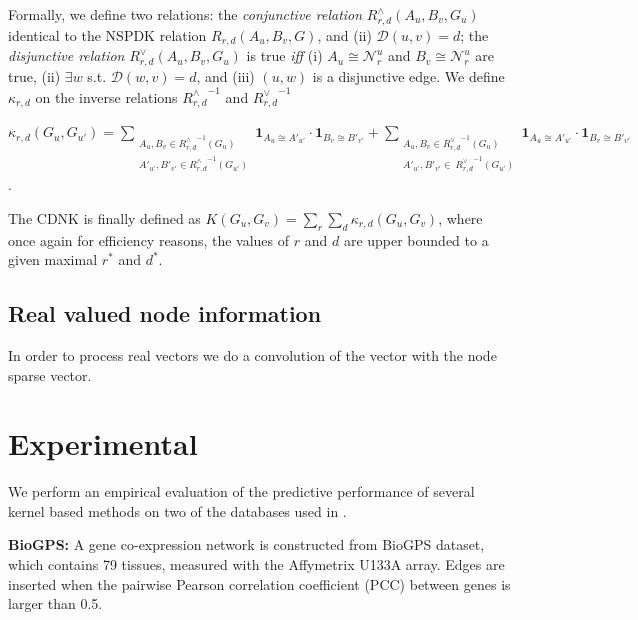 \documentclass[review]{elsarticle}
\begin{document}
Formally, we define two relations: the \textit{conjunctive relation} $R^{\wedge}_{r,d}(A_u, B_v, G_u)$ identical to the NSPDK relation $R_{r,d}(A_u, B_v, G)$,  and (ii) $\mathcal{D}(u,v)= d$; the \textit{disjunctive relation} $R_{r,d}^{\vee}(A_u, B_v, G_u)$ is true {\em iff} (i)  $A_u \cong \mathcal{N}_r^u$ and $B_v \cong \mathcal{N}_r^u$ are true, (ii) $\exists w$ s.t. $\mathcal{D}(w,v)= d$, and (iii) $(u,w)$ is a disjunctive edge. We define $\kappa_{r,d}$ on the  inverse relations ${R^{\wedge}_{r,d}}^{ -1}$ and ${R^{\vee}_{r,d}}^{ -1}$
\begin{center}
 $\kappa_{r,d}(G_u,G_{u'}) = \!\!\!\!\!\!\!\!\!\!\!\!
 \sum\limits_{\substack {A_u,{B}_{v} \in {R_{r,d}^{\wedge}}^{ -1}(G_u) \\ A'_{u'},{B'}_{v'} \in {R_{r,d}^{\wedge}}^{ -1}(G_{u'}) }} \!\!\!\!\!\!\!\!\!\!\!\!
  { \textbf{1}_{A_u \cong A'_{u'}} \cdot { \textbf{1}_{B_{v} \cong B'_{v'}}}}
+ \!\!\!\!\!\!\!\!\!\!\!\!
 \sum\limits_{\substack {A_u,{B}_{v} \in {R_{r,d}^{\vee}}^{ -1}(G_u) \\
  A'_{u'},{B'}_{v'} \in \ {R_{r,d}^{\vee}}^{ -1}(G_{u'}) }} \!\!\!\!\!\!\!\!\!\!\!\!
  { \textbf{1}_{A_u \cong A'_{u'}} \cdot { \textbf{1}_{B_{v} \cong B'_{v'}}}}
  $.
\end{center}
The CDNK is finally defined as $K(G_u,G_v) = \sum\limits_{r}{\sum\limits_{d}{\kappa_{r,d}(G_u,G_v)}}$, where once again for efficiency reasons, the values of $r$ and $d$ are upper bounded to a given maximal $r^*$ and $d^*$.


\subsection{Real valued node information}
In order to process real vectors we do a convolution of the vector with the node sparse vector.




\section{Experimental}
We perform an empirical evaluation of the predictive performance of several kernel based methods on two of the databases used in \cite{chen2014disease}.

\textbf{BioGPS:} A gene co-expression network is constructed from BioGPS dataset, which contains 79 tissues, measured with the Affymetrix U133A array. Edges are inserted when the pairwise Pearson correlation coefficient (PCC) between genes is larger than 0.5.
\end{document}
